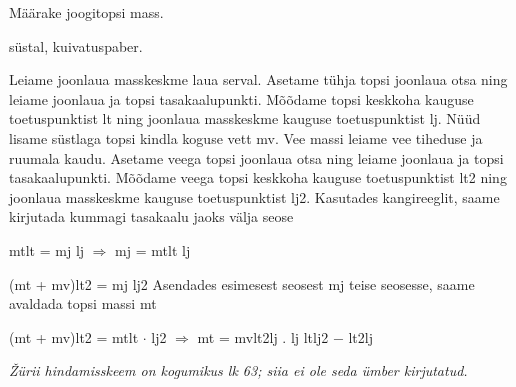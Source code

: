 
Määrake joogitopsi mass.

süstal, kuivatuspaber.

\hint

\solu
Leiame joonlaua masskeskme laua serval. Asetame tühja topsi joonlaua otsa ning leiame joonlaua ja topsi tasakaalupunkti. Mõõdame topsi keskkoha kauguse toetuspunktist lt ning joonlaua masskeskme kauguse toetuspunktist lj. Nüüd lisame süstlaga topsi kindla koguse vett mv. Vee massi leiame vee tiheduse ja ruumala kaudu. Asetame veega topsi joonlaua otsa ning leiame joonlaua ja topsi tasakaalupunkti. Mõõdame veega topsi keskkoha kauguse toetuspunktist lt2 ning joonlaua masskeskme kauguse toetuspunktist lj2. Kasutades kangireeglit, saame kirjutada kummagi tasakaalu jaoks välja seose

mtlt = mj lj $\Rightarrow$ mj = mtlt lj

(mt + mv)lt2 = mj lj2 Asendades esimesest seosest mj teise seosesse, saame avaldada topsi massi mt

(mt + mv)lt2 = mtlt $\cdot$ lj2 $\Rightarrow$ mt = mvlt2lj . lj ltlj2 $-$ lt2lj

\textit{Žürii hindamisskeem on kogumikus lk 63; siia ei ole seda ümber kirjutatud.}
\probend
